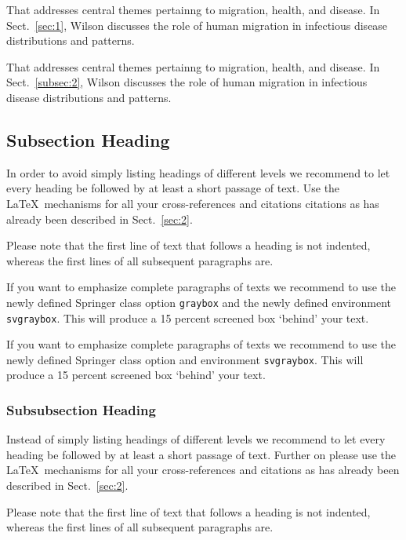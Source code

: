 \documentclass[graybox]{svmult}
\begin{document}
\begin{description}[Type 1]
\item[Type 1]{That addresses central themes pertainng to migration, health, and disease. In Sect.~\ref{sec:1}, Wilson discusses the role of human migration in infectious disease distributions and patterns.}
\item[Type 2]{That addresses central themes pertainng to migration, health, and disease. In Sect.~\ref{subsec:2}, Wilson discusses the role of human migration in infectious disease distributions and patterns.}
\end{description}

\subsection{Subsection Heading} %
\label{sec:subsec}
In order to avoid simply listing headings of different levels we recommend to let every heading be followed by at least a short passage of text. Use the \LaTeX\ mechanisms for all your cross-references and citations citations as has already been described in Sect.~\ref{sec:2}.

Please note that the first line of text that follows a heading is not indented, whereas the first lines of all subsequent paragraphs are.

\begin{svgraybox}
If you want to emphasize complete paragraphs of texts we recommend to use the newly defined Springer class option \verb|graybox| and the newly defined environment \verb|svgraybox|. This will produce a 15 percent screened box
`behind' your text.

If you want to emphasize complete paragraphs of texts we recommend to use the newly defined Springer class option and environment \verb|svgraybox|. This will produce a 15 percent screened box
`behind' your text.
\end{svgraybox}


\subsubsection{Subsubsection Heading}
Instead of simply listing headings of different levels we recommend to
let every heading be followed by at least a short passage of text.
Further on please use the \LaTeX\ mechanisms for all your
cross-references and citations as has already been described in
Sect.~\ref{sec:2}.

Please note that the first line of text that follows a heading is not indented,
whereas the first lines of all subsequent paragraphs are.
\end{document}
